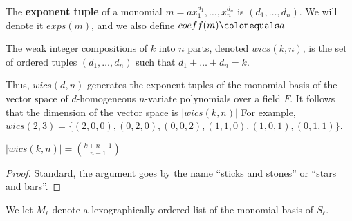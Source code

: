 \begin{defn}
    The \textbf{exponent tuple} of a monomial $m = ax_{1}^{d_1}, \dots, x_{n}^{d_n}$ is $(d_1, \dots, d_n)$. 
	We will denote it $exps(m)$, and we also define $coeff(m) \colonequals a$
\end{defn}




\begin{defn}
    The weak integer compositions of $k$ into $n$ parts, denoted $wics(k, n)$, is the set of ordered tuples 
	\((d_{1}, \ldots, d_{n})\) such that \(d_{1} + \ldots + d_{n} = k\).
\end{defn}

Thus, $wics(d, n)$ generates the exponent tuples of the monomial basis of the vector space of $d$-homogeneous $n$-variate polynomials over a field $F$.
It follows that the dimension of the vector space is $|wics(k, n)|$
For example, %
$wics(2, 3) = \lbrace (2, 0, 0), (0, 2, 0), (0, 0, 2), (1, 1, 0), (1, 0, 1), (0, 1, 1) \rbrace$.
\begin{lem}
    \label{lem:wics:size}
    $|wics(k, n)| = \binom{k + n - 1}{n - 1}$
\end{lem}

\begin{proof}
	Standard, the argument goes by the name ``sticks and stones'' or ``stars and bars''.
\end{proof}

We let \(M_{\ell}\) denote a lexographically-ordered list
of the monomial basis of \(S_{\ell}\).

